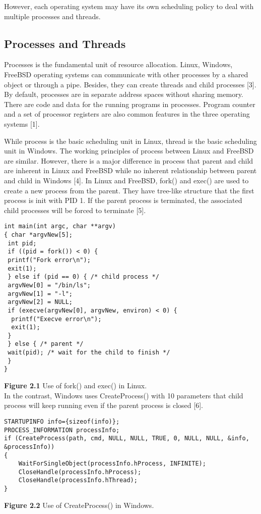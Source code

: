 \documentclass[10pt,draftclsnofoot,journal,compsoc,onecolumn]{IEEEtran}
\begin{document}
However, each operating system may have its own scheduling policy to deal with multiple processes and threads.

\subsection{Processes and Threads}
Processes is the fundamental unit of resource allocation. Linux, Windows, FreeBSD operating systems can communicate with other processes by a shared object or through a pipe. Besides, they can create threads and child processes [3]. By default, processes are in separate address spaces without sharing memory. There are code and data for the running programs in processes. Program counter and a set of processor registers are also common features in the three operating systems [1].

While process is the basic scheduling unit in Linux, thread is the basic scheduling unit in Windows. The working principles of process between Linux and FreeBSD are similar. However, there is a major difference in process that parent and child are inherent in Linux and FreeBSD while no inherent relationship between parent and child in Windows [4]. In Linux and FreeBSD, fork() and exec() are used to create a new process from the parent. They have tree-like structure that the first process is init with PID 1. If the parent process is terminated, the associated child processes will be forced to terminate [5]. \\

\begin{lstlisting}[style=CStyle]
int main(int argc, char **argv) 
{ char *argvNew[5]; 
 int pid;
 if ((pid = fork()) < 0) { 
 printf("Fork error\n");
 exit(1);
 } else if (pid == 0) { /* child process */ 
 argvNew[0] = "/bin/ls";
 argvNew[1] = "-l";
 argvNew[2] = NULL;
 if (execve(argvNew[0], argvNew, environ) < 0) {
  printf("Execve error\n");
  exit(1);
 }
 } else { /* parent */
 wait(pid); /* wait for the child to finish */
 }
}
\end{lstlisting}
\textbf{Figure 2.1} Use of fork() and exec() in Linux. \\

In the contrast, Windows uses CreateProcess() with 10 parameters that child process will keep running even if the parent process is closed [6]. \\

\begin{lstlisting}[style=CStyle]
STARTUPINFO info={sizeof(info)};
PROCESS_INFORMATION processInfo;
if (CreateProcess(path, cmd, NULL, NULL, TRUE, 0, NULL, NULL, &info, &processInfo))
{
    WaitForSingleObject(processInfo.hProcess, INFINITE);
    CloseHandle(processInfo.hProcess);
    CloseHandle(processInfo.hThread);
}
\end{lstlisting}
\textbf{Figure 2.2} Use of CreateProcess() in Windows. \\
\end{document}
